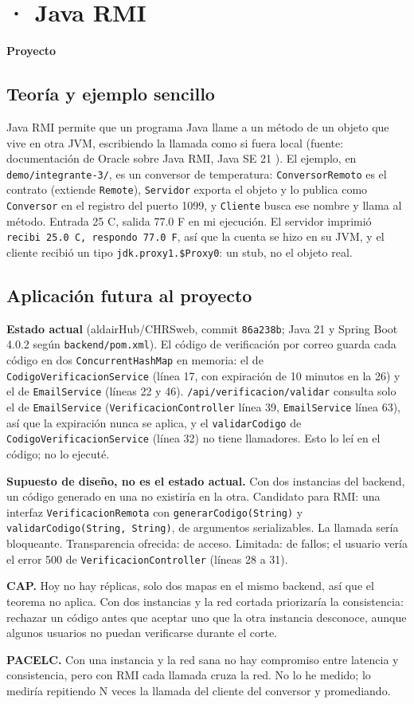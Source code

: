 \section*{\personaTres · Java RMI}
\small
\textbf{Proyecto}\quad \proyectoTres\par
\subsection*{Teoría y ejemplo sencillo}
Java RMI permite que un programa Java llame a un método de un objeto que vive en otra JVM, escribiendo la llamada como si fuera local (fuente: documentación de Oracle sobre Java RMI, Java SE 21 \cite{oraclermi21}). El ejemplo, en \texttt{demo/integrante-3/}, es un conversor de temperatura: \texttt{ConversorRemoto} es el contrato (extiende \texttt{Remote}), \texttt{Servidor} exporta el objeto y lo publica como \texttt{Conversor} en el registro del puerto 1099, y \texttt{Cliente} busca ese nombre y llama al método. Entrada 25 C, salida 77.0 F en mi ejecución. El servidor imprimió \texttt{recibi 25.0 C, respondo 77.0 F}, así que la cuenta se hizo en su JVM, y el cliente recibió un tipo \texttt{jdk.proxy1.\$Proxy0}: un stub, no el objeto real.
\subsection*{Aplicación futura al proyecto}
\textbf{Estado actual} (aldairHub/CHRSweb, commit \texttt{86a238b}; Java 21 y Spring Boot 4.0.2 según \texttt{backend/pom.xml}). El código de verificación por correo guarda cada código en dos \texttt{ConcurrentHashMap} en memoria: el de \texttt{CodigoVerificacionService} (línea 17, con expiración de 10 minutos en la 26) y el de \texttt{EmailService} (líneas 22 y 46). \texttt{/api/verificacion/validar} consulta solo el de \texttt{EmailService} (\texttt{VerificacionController} línea 39, \texttt{EmailService} línea 63), así que la expiración nunca se aplica, y el \texttt{validarCodigo} de \texttt{CodigoVerificacionService} (línea 32) no tiene llamadores. Esto lo leí en el código; no lo ejecuté.\par
\textbf{Supuesto de diseño, no es el estado actual.} Con dos instancias del backend, un código generado en una no existiría en la otra. Candidato para RMI: una interfaz \texttt{VerificacionRemota} con \texttt{generarCodigo(String)} y \texttt{validarCodigo(String, String)}, de argumentos serializables. La llamada sería bloqueante. Transparencia ofrecida: de acceso. Limitada: de fallos; el usuario vería el error 500 de \texttt{VerificacionController} (líneas 28 a 31).\par
\textbf{CAP.} Hoy no hay réplicas, solo dos mapas en el mismo backend, así que el teorema no aplica. Con dos instancias y la red cortada priorizaría la consistencia: rechazar un código antes que aceptar uno que la otra instancia desconoce, aunque algunos usuarios no puedan verificarse durante el corte.\par
\textbf{PACELC.} Con una instancia y la red sana no hay compromiso entre latencia y consistencia, pero con RMI cada llamada cruza la red. No lo he medido; lo mediría repitiendo N veces la llamada del cliente del conversor y promediando.
